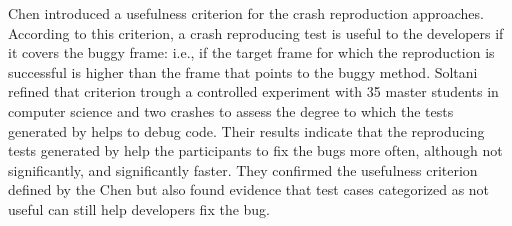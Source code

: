 Chen \etal \cite{Chen2015} introduced a usefulness criterion for the crash reproduction approaches. 
According to this criterion, a crash reproducing test is useful to the developers if it covers the buggy frame: i.e., if the target frame for which the reproduction is successful is higher than the frame that points to the buggy method.
Soltani \etal \cite{Soltani2018a} refined that criterion trough a controlled experiment with 35 master students in computer science and two crashes to assess the degree to which the tests generated by \evocrash helps to debug code. 
Their results indicate that the reproducing tests generated by \evocrash help the participants to fix the bugs more often, although not significantly, and significantly faster. 
They confirmed the usefulness criterion defined by the Chen \etal \cite{Chen2015} but also found evidence that test cases categorized as not useful can still help developers fix the bug.